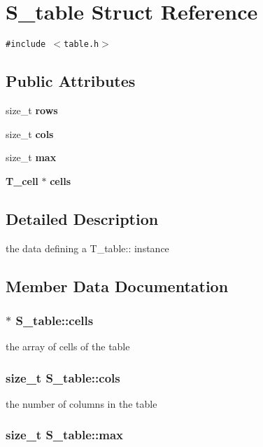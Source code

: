 \section{S\_\-table Struct Reference}
\label{structS__table}
{\tt \#include $<$table.h$>$}

\subsection*{Public Attributes}
\begin{CompactItemize}
\item 
size\_\-t {\bf rows}
\item 
size\_\-t {\bf cols}
\item 
size\_\-t {\bf max}
\item 
{\bf T\_\-cell} $\ast$ {\bf cells}
\end{CompactItemize}


\subsection{Detailed Description}
the data defining a T\_\-table:: instance 



\subsection{Member Data Documentation}
\subsubsection{$\ast$ S\_\-table::cells}\label{structS__table_m3}


the array of cells of the table 
\subsubsection{\setlength{\rightskip}{0pt plus 5cm}size\_\-t S\_\-table::cols}\label{structS__table_m1}


the number of columns in the table 
\subsubsection{\setlength{\rightskip}{0pt plus 5cm}size\_\-t S\_\-table::max}\label{structS__table_m2}


